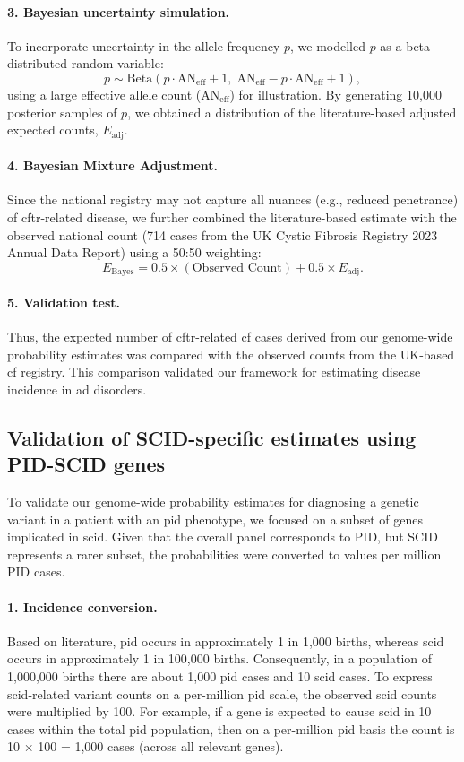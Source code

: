\paragraph{3. Bayesian uncertainty simulation.}
To incorporate uncertainty in the allele frequency \( p \), we modelled \( p \) as a beta-distributed random variable:
\[
p \sim \mathrm{Beta}(p \cdot \text{AN}_{\text{eff}} + 1,\; \text{AN}_{\text{eff}} - p \cdot \text{AN}_{\text{eff}} + 1),
\]
using a large effective allele count (\(\text{AN}_{\text{eff}}\)) for illustration. 
By generating 10,000 posterior samples of \( p \), we obtained a distribution of the literature-based adjusted expected counts, \(E_{\text{adj}}\).

\paragraph{4. Bayesian Mixture Adjustment.}
Since the national registry may not capture all nuances (e.g., reduced penetrance) of \ac{cftr}-related disease, we further combined the literature-based estimate with the observed national count (714 cases from the UK Cystic Fibrosis Registry 2023 Annual Data Report) using a 50:50 weighting:
\[
E_{\text{Bayes}} = 0.5 \times (\text{Observed Count}) + 0.5 \times E_{\text{adj}}.
\]

\paragraph{5. Validation test.}
Thus, the expected number of \ac{cftr}-related \ac{cf} cases derived from our genome-wide probability estimates was compared with the observed counts from the UK-based \ac{cf} registry. This comparison validated our framework for estimating disease incidence in \ac{ad} disorders.

\subsection{Validation of SCID-specific estimates using PID-SCID genes}

To validate our genome-wide probability estimates for diagnosing a genetic variant in a patient with an \ac{pid} phenotype, we focused on a subset of genes implicated in \ac{scid}. Given that the overall panel corresponds to PID, but SCID represents a rarer subset, the probabilities were converted to values per million PID cases.

\paragraph{1. Incidence conversion.}
Based on literature, \ac{pid} occurs in approximately 1 in 1,000 births, whereas \ac{scid} occurs in approximately 1 in 100,000 births. 
Consequently, in a population of 1,000,000 births there are about 1,000 \ac{pid} cases and 10 \ac{scid} cases. 
To express \ac{scid}-related variant counts on a per-million \ac{pid}  scale, the observed \ac{scid} counts were multiplied by 100. 
For example, if a gene is expected to cause \ac{scid} in 10 cases within the total \ac{pid} population, then on a per-million \ac{pid}  basis the count is 10 × 100 = 1,000 cases (across all relevant genes).


